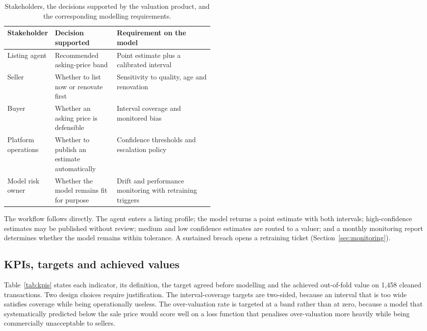 \begin{table}[htbp]
\centering
\caption{Stakeholders, the decisions supported by the valuation product, and the
corresponding modelling requirements.}
\label{tab:stakeholders}
\small
\begin{tabularx}{\linewidth}{@{}L{0.19\linewidth}L{0.30\linewidth}X@{}}
\toprule
\textbf{Stakeholder} & \textbf{Decision supported} & \textbf{Requirement on the model} \\
\midrule
Listing agent & Recommended asking-price band & Point estimate plus a calibrated interval \\
Seller & Whether to list now or renovate first & Sensitivity to quality, age and renovation \\
Buyer & Whether an asking price is defensible & Interval coverage and monitored bias \\
Platform operations & Whether to publish an estimate automatically & Confidence thresholds and escalation policy \\
Model risk owner & Whether the model remains fit for purpose & Drift and performance monitoring with retraining triggers \\
\bottomrule
\end{tabularx}
\end{table}

The workflow follows directly. The agent enters a listing profile; the model returns
a point estimate with both intervals; high-confidence estimates may be published
without review; medium and low confidence estimates are routed to a valuer; and a
monthly monitoring report determines whether the model remains within tolerance. A
sustained breach opens a retraining ticket (Section~\ref{sec:monitoring}).

\subsection{KPIs, targets and achieved values}

Table~\ref{tab:kpis} states each indicator, its definition, the target agreed before
modelling and the achieved out-of-fold value on 1,458 cleaned transactions. Two
design choices require justification. The interval-coverage targets are two-sided,
because an interval that is too wide satisfies coverage while being operationally
useless. The over-valuation rate is targeted at a band rather than at zero, because a
model that systematically predicted below the sale price would score well on a loss
function that penalises over-valuation more heavily while being commercially
unacceptable to sellers.


